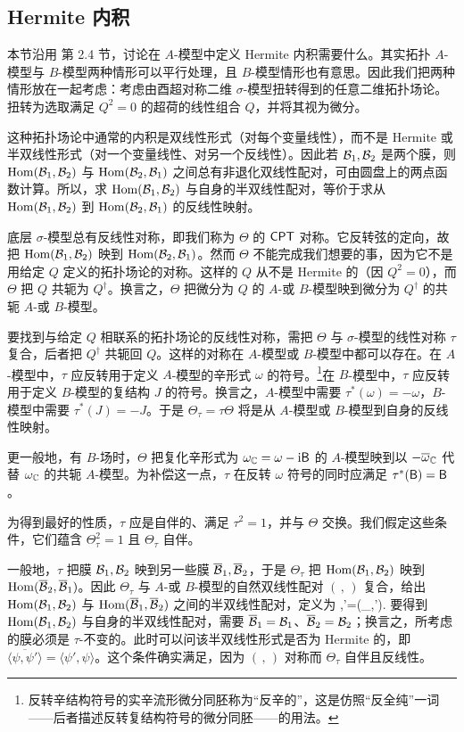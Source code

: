 \subsection{Hermite 内积}\label{hermitian}

本节沿用 \cite{GW} 第 2.4 节，讨论在 $A$-模型中定义 Hermite 内积需要什么。其实拓扑 $A$-模型与 $B$-模型两种情形可以平行处理，且 $B$-模型情形也有意思。因此我们把两种情形放在一起考虑：考虑由酉超对称二维 $\sigma$-模型扭转得到的任意二维拓扑场论。扭转为选取满足 $Q^2=0$ 的超荷的线性组合 $Q$，并将其视为微分。

这种拓扑场论中通常的内积是双线性形式（对每个变量线性），而不是 Hermite 或半双线性形式（对一个变量线性、对另一个反线性）。因此若 ${\mathcal B}_1,{\mathcal B}_2$ 是两个膜，则 ${\mathrm{Hom}}({\mathcal B}_1,{\mathcal B}_2)$ 与 ${\mathrm{Hom}}({\mathcal B}_2,{\mathcal B}_1)$ 之间总有非退化双线性配对，可由圆盘上的两点函数计算。所以，求 ${\mathrm{Hom}}({\mathcal B}_1,{\mathcal B}_2)$ 与自身的半双线性配对，等价于求从 ${\mathrm{Hom}}({\mathcal B}_1,{\mathcal B}_2)$ 到 ${\mathrm{Hom}}({\mathcal B}_2,{\mathcal B}_1)$ 的反线性映射。

底层 $\sigma$-模型总有反线性对称，即我们称为 $\Theta$ 的 ${\sf{CPT}}$ 对称。它反转弦的定向，故把 ${\mathrm{Hom}}({\mathcal B}_1,{\mathcal B}_2)$ 映到 ${\mathrm{Hom}}({\mathcal B}_2,{\mathcal B}_1)$。然而 $\Theta$ 不能完成我们想要的事，因为它不是用给定 $Q$ 定义的拓扑场论的对称。这样的 $Q$ 从不是 Hermite 的（因 $Q^2=0$），而 $\Theta$ 把 $Q$ 共轭为 $Q^\dagger$。换言之，$\Theta$ 把微分为 $Q$ 的 $A$-或 $B$-模型映到微分为 $Q^\dagger$ 的共轭 $A$-或 $B$-模型。

要找到与给定 $Q$ 相联系的拓扑场论的反线性对称，需把 $\Theta$ 与 $\sigma$-模型的线性对称 $\tau$ 复合，后者把 $Q^\dagger$ 共轭回 $Q$。这样的对称在 $A$-模型或 $B$-模型中都可以存在。在 $A$-模型中，$\tau$ 应反转用于定义 $A$-模型的辛形式 $\omega$ 的符号。\footnote{反转辛结构符号的实辛流形微分同胚称为“反辛的”，这是仿照“反全纯”一词——后者描述反转复结构符号的微分同胚——的用法。}在 $B$-模型中，$\tau$ 应反转用于定义 $B$-模型的复结构 $J$ 的符号。换言之，$A$-模型中需要 $\tau^*(\omega)=-\omega$，$B$-模型中需要 $\tau^*(J)=-J$。于是 $\Theta_\tau=\tau\Theta$ 将是从 $A$-模型或 $B$-模型到自身的反线性映射。

更一般地，有 $B$-场时，$\Theta$ 把复化辛形式为 $\omega_{\mathbb C}=\omega-{\mathrm i}{\sf B}$ 的 $A$-模型映到以 $-\overline\omega_{\mathbb C}$ 代替 $\omega_{\mathbb C}$ 的共轭 $A$-模型。为补偿这一点，$\tau$ 在反转 $\omega$ 符号的同时应满足 $\tau^*({\sf B})={\sf B}$。

为得到最好的性质，$\tau$ 应是自伴的、满足 $\tau^2=1$，并与 $\Theta$ 交换。我们假定这些条件，它们蕴含 $\Theta_\tau^2=1$ 且 $\Theta_\tau$ 自伴。

一般地，$\tau$ 把膜 ${\mathcal B}_1,{\mathcal B}_2$ 映到另一些膜 $\overline{{\mathcal B}}_1,\overline{{\mathcal B}}_2$，于是 $\Theta_\tau$ 把 ${\mathrm{Hom}}({\mathcal B}_1,{\mathcal B}_2)$ 映到 ${\mathrm{Hom}}(\overline{{\mathcal B}}_2,\overline{{\mathcal B}}_1)$。因此 $\Theta_\tau$ 与 $A$-或 $B$-模型的自然双线性配对 $(\,,\,)$ 复合，给出 ${\mathrm{Hom}}({\mathcal B}_1,{\mathcal B}_2)$ 与 ${\mathrm{Hom}}(\overline{{\mathcal B}}_1,\overline{{\mathcal B}}_2)$ 之间的半双线性配对，定义为
\be\label{wofo}\langle\psi,\psi'\rangle=(\Theta_\tau\psi,\psi').\ee
要得到 ${\mathrm{Hom}}({\mathcal B}_1,{\mathcal B}_2)$ 与自身的半双线性配对，需要 $\overline{{\mathcal B}}_1={\mathcal B}_1$、$\overline{{\mathcal B}}_2={\mathcal B}_2$；换言之，所考虑的膜必须是 $\tau$-不变的。此时可以问该半双线性形式是否为 Hermite 的，即 $\overline{\langle\psi,\psi'\rangle}=\langle\psi',\psi\rangle$。这个条件确实满足，因为 $(\,,\,)$ 对称而 $\Theta_\tau$ 自伴且反线性。

